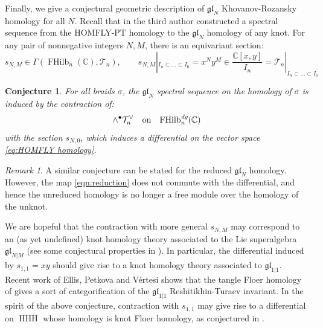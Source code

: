 \documentclass[12pt]{amsart}
\numberwithin{equation}{section}
\newtheorem{conjecture}[theorem]{Conjecture}
\theoremstyle{definition}
\theoremstyle{remark}
\newtheorem{remark}[theorem]{Remark}
\DeclareMathOperator{\FHilb}{FHilb}
\DeclareMathOperator{\HHH}{HHH}
\newcommand{\CC}{\mathbb{C}}
\newcommand{\CT}{\mathcal{T}}
\renewcommand{\1}{\mathbf{1}}
\newcommand{\FH}{\mathrm{FHilb}}
\newcommand{\fgl}{\mathfrak{gl}}
\newcommand{\edg}{\emph{dg}}
\begin{document}
Finally, we give a conjectural geometric description of $\fgl_N$ Khovanov-Rozansky homology \cite{KhR1,KhR2} for all $N$. Recall that in \cite{RasDiff} the third  author constructed a spectral sequence from the HOMFLY-PT homology to the $\fgl_N$ homology of any knot. For any pair of nonnegative integers $N,M$, there is an equivariant section: 
$$
s_{N,M}\in \Gamma \left(\FHilb_n(\CC),\CT_n \right), \qquad s_{N,M}|_{I_n \subset \ldots \subset I_0} = x^Ny^M \in \frac {\CC[x,y]}{I_n} = \CT_n|_{I_n \subset \ldots \subset I_0}
$$


\begin{conjecture}
\label{conj:diff}
For all braids $\sigma$, the $\fgl_N$ spectral sequence on the homology of $\overline{\sigma}$ is induced by the contraction of:
$$
\wedge^\bullet \CT_n^\vee \quad \text{on} \quad \FH^\edg_n(\CC)
$$
with the section $s_{N,0}$, which induces a differential on the vector space \eqref{eq:HOMFLY homology}.
\end{conjecture}

\begin{remark}
A similar conjecture can be stated for the reduced $\fgl_N$ homology. However, the map \eqref{eqn:reduction} does not commute with the differential, and hence the unreduced homology is no longer a free module over the homology of the unknot.
\end{remark}

We are hopeful that the contraction with more general $s_{N,M}$ may correspond to an (as yet undefined) knot homology theory associated to the Lie superalgebra $\fgl_{N|M}$ (see some conjectural properties in \cite{GGS}). In particular, the differential induced by $s_{1,1}=xy$ should give rise to  a knot homology theory  associated to $\fgl_{1|1}$.  
Recent work of Ellis, Petkova and V\'ertesi \cite{EPV} shows that the tangle Floer homology of \cite{PV} gives  a sort of categorification of the \(\fgl_{1|1}\) Reshitikhin-Turaev invariant. 
In the spirit of the above conjecture,  contraction with $s_{1,1}$ may give rise to a differential on $\HHH$ whose homology is knot Floer homology, as conjectured in \cite{DGR}. 
\end{document}
